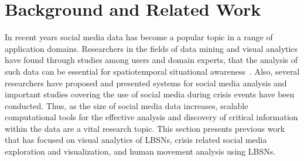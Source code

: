 \chapter{Background and Related Work}
In recent years social media data has become a popular topic in a range of application domains. 
Researchers in the fields of data mining and visual analytics have found through studies among users and domain experts, that the analysis of such data can be essential for spatiotemporal situational awareness~\cite{MacEachren:2011:SGA, Sakaki:2010:EST}.
Also, several researchers have proposed and presented systems for social media analysis and important studies covering the use of social media during crisis events have been conducted.
Thus, as the size of social media data increases, scalable computational tools for the effective analysis and 
discovery of critical information within the data are a vital research topic.
This section presents previous work that has focused on visual analytics of LBSNs, crisis related social media exploration and visualization, and human movement analysis using LBSNs.

